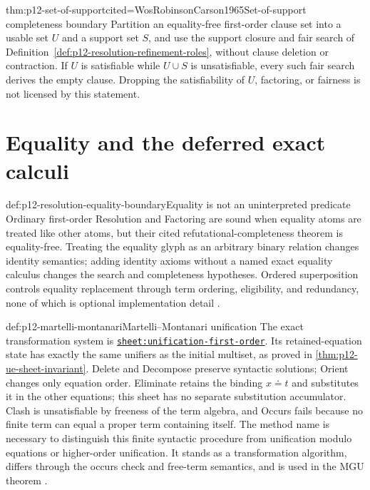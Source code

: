 \begin{hbtheorem}{thm:p12-set-of-support}{cited=WosRobinsonCarson1965}{Set-of-support completeness boundary}
Partition an equality-free first-order clause set into a usable set \(U\) and
a support set \(S\), and use the support closure and fair search of
Definition~\ref{def:p12-resolution-refinement-roles}, without clause deletion
or contraction.  If \(U\) is satisfiable while \(U\cup S\) is unsatisfiable,
every such fair search derives the empty clause.  Dropping the
satisfiability of \(U\), factoring, or fairness is not licensed by this
statement.
\end{hbtheorem}

\section{Equality and the deferred exact calculi}

\begin{proofboundary}{def:p12-resolution-equality-boundary}{Equality is not an uninterpreted predicate}
Ordinary first-order Resolution and Factoring are sound when equality atoms are
treated like other atoms, but their cited refutational-completeness theorem is
equality-free.  Treating the equality glyph as an arbitrary binary relation
changes identity semantics; adding identity axioms without a named exact
equality calculus changes the search and completeness hypotheses.  Ordered
superposition controls equality replacement through term ordering,
eligibility, and redundancy, none of which is optional implementation detail
\cite{BachmairGanzinger2001}.
\end{proofboundary}

\begin{hbmethod}{def:p12-martelli-montanari}{Martelli--Montanari unification}
The exact transformation system is
\hyperref[sheet:unification-first-order]{\texttt{sheet:unification-first-order}}.
Its retained-equation state has exactly the same unifiers as the initial
multiset, as proved in \cref{thm:p12-ue-sheet-invariant}. Delete and Decompose
preserve syntactic solutions; Orient changes only equation order. Eliminate
retains the binding \(x\doteq t\) and substitutes it in the other equations;
this sheet has no separate substitution accumulator. Clash is unsatisfiable by freeness of the
term algebra, and Occurs fails because no finite term can equal a proper term
containing itself. The method name is necessary to distinguish this finite
syntactic procedure from unification modulo equations or higher-order
unification. It stands as a transformation algorithm, differs through the
occurs check and free-term semantics, and is used in the MGU theorem
\cite{MartelliMontanari1982,BaaderSnyder2001}.
\end{hbmethod}


